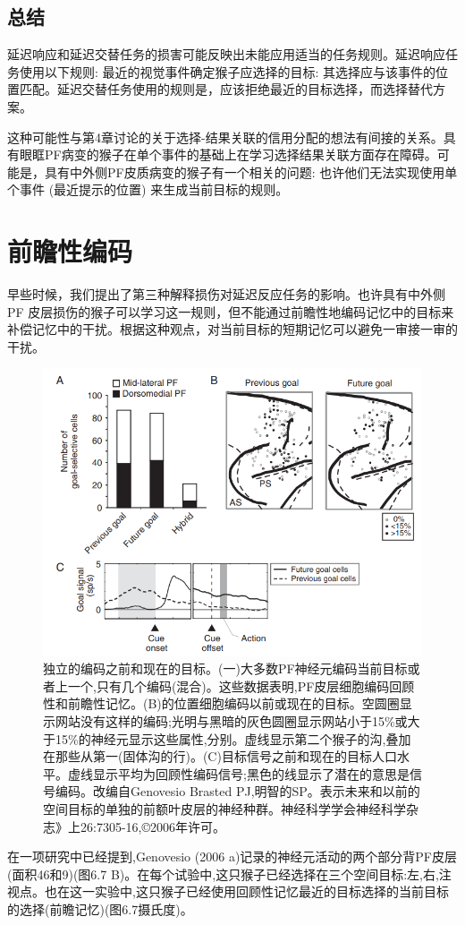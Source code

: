\subsection{总结}
延迟响应和延迟交替任务的损害可能反映出未能应用适当的任务规则。延迟响应任务使用以下规则: 最近的视觉事件确定猴子应选择的目标: 其选择应与该事件的位置匹配。延迟交替任务使用的规则是，应该拒绝最近的目标选择，而选择替代方案。

这种可能性与第4章讨论的关于选择-结果关联的信用分配的想法有间接的关系。具有眼眶PF病变的猴子在单个事件的基础上在学习选择结果关联方面存在障碍。可能是，具有中外侧PF皮质病变的猴子有一个相关的问题: 也许他们无法实现使用单个事件 (最近提示的位置) 来生成当前目标的规则。

\section{前瞻性编码}
早些时候，我们提出了第三种解释损伤对延迟反应任务的影响。也许具有中外侧 PF 皮层损伤的猴子可以学习这一规则，但不能通过前瞻性地编码记忆中的目标来补偿记忆中的干扰。根据这种观点，对当前目标的短期记忆可以避免一审接一审的干扰。
\begin{figure}
	\centering
	\includegraphics[width=0.5\linewidth]{image_pfc/Fig_6_7}
	\caption{独立的编码之前和现在的目标。(一)大多数PF神经元编码当前目标或者上一个,只有几个编码(混合)。这些数据表明,PF皮层细胞编码回顾性和前瞻性记忆。(B)的位置细胞编码以前或现在的目标。空圆圈显示网站没有这样的编码;光明与黑暗的灰色圆圈显示网站小于15\%或大于15\%的神经元显示这些属性,分别。虚线显示第二个猴子的沟,叠加在那些从第一(固体沟的行)。(C)目标信号之前和现在的目标人口水平。虚线显示平均为回顾性编码信号;黑色的线显示了潜在的意思是信号编码。改编自Genovesio Brasted PJ,明智的SP。表示未来和以前的空间目标的单独的前额叶皮层的神经种群。神经科学学会神经科学杂志》上26:7305-16,©2006年许可。}
	\label{fig:fig}
\end{figure}
在一项研究中已经提到,Genovesio (2006 a)记录的神经元活动的两个部分背PF皮层(面积46和9)(图6.7 B)。在每个试验中,这只猴子已经选择在三个空间目标:左,右,注视点。也在这一实验中,这只猴子已经使用回顾性记忆最近的目标选择的当前目标的选择(前瞻记忆)(图6.7摄氏度)。

